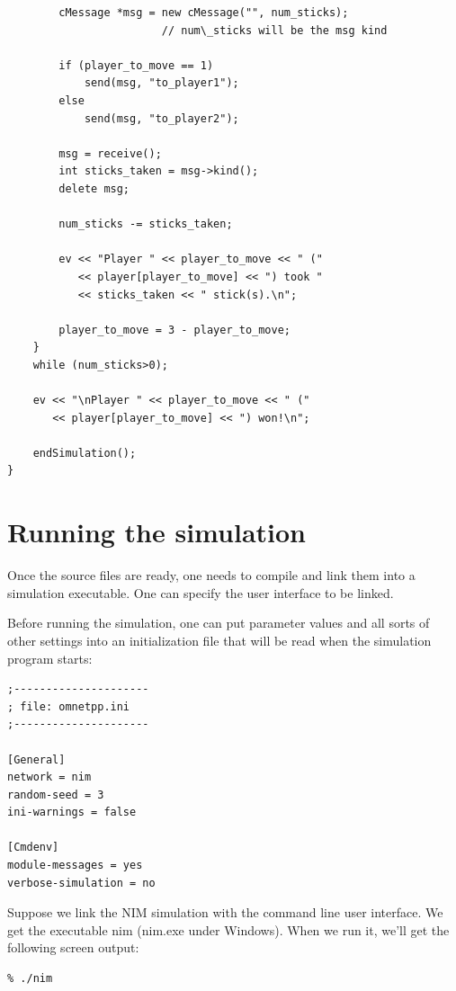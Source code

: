 \begin{Verbatim}
        cMessage *msg = new cMessage("", num_sticks);
                        // num\_sticks will be the msg kind

        if (player_to_move == 1)
            send(msg, "to_player1");
        else
            send(msg, "to_player2");

        msg = receive();
        int sticks_taken = msg->kind();
        delete msg;

        num_sticks -= sticks_taken;

        ev << "Player " << player_to_move << " ("
           << player[player_to_move] << ") took "
           << sticks_taken << " stick(s).\n";

        player_to_move = 3 - player_to_move;
    }
    while (num_sticks>0);

    ev << "\nPlayer " << player_to_move << " ("
       << player[player_to_move] << ") won!\n";

    endSimulation();
}
\end{Verbatim}




\section{Running the simulation}

Once the source files are ready, one needs to compile and link 
them into a simulation executable. One can specify the user interface 
to be linked.

Before running the simulation, one can put parameter values and 
all sorts of other settings into an initialization file that 
will be read when the simulation program starts:


\begin{Verbatim}
;---------------------
; file: omnetpp.ini
;---------------------

[General]
network = nim
random-seed = 3
ini-warnings = false

[Cmdenv]
module-messages = yes
verbose-simulation = no
\end{Verbatim}

Suppose we link the NIM simulation with the command line user 
interface. We get the executable nim (nim.exe under Windows). 
When we run it, we'll get the following screen output:

\begin{Verbatim}
% ./nim
\end{Verbatim}

